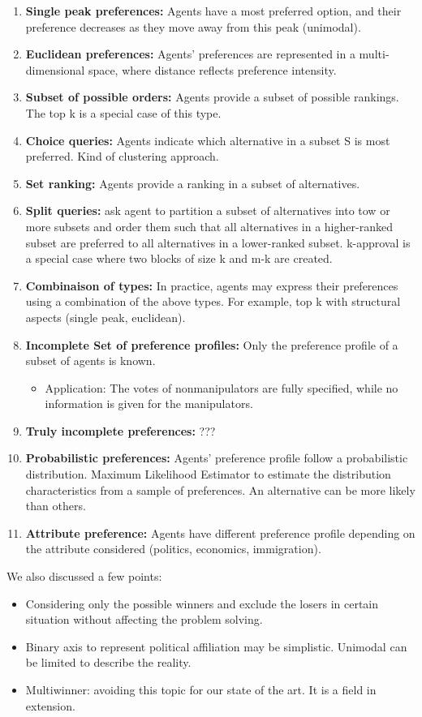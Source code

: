 \documentclass{article}
\begin{document}
\begin{enumerate}
    \item \textbf{Single peak preferences:} Agents have a most preferred option, and their preference decreases as they move away from this peak (unimodal).
    \item \textbf{Euclidean preferences:} Agents' preferences are represented in a multi-dimensional space, where distance reflects preference intensity.
    \item \textbf{Subset of possible orders:} Agents provide a subset of possible rankings. The top k is a special case of this type.
    \item \textbf{Choice queries:} Agents indicate which alternative in a subset S is most preferred. Kind of clustering approach.
    \item \textbf{Set ranking:} Agents provide a ranking in a subset of alternatives.
    \item \textbf{Split queries:} ask agent to partition a subset of alternatives into tow or more subsets and order them such that all alternatives in a higher-ranked subset are preferred to all alternatives in a lower-ranked subset. k-approval is a special case where two blocks of size k and m-k are created.
    \item \textbf{Combinaison of types:} In practice, agents may express their preferences using a combination of the above types. For example, top k with structural aspects (single peak, euclidean).
    \item \textbf{Incomplete Set of preference profiles:} Only the preference profile of a subset of agents is known.
    \begin{itemize}
        \item Application: The votes of nonmanipulators are fully specified, while no information is given for the manipulators.
    \end{itemize}
    \item \textbf{Truly incomplete preferences:} ???
    \item \textbf{Probabilistic preferences:} Agents' preference profile follow a probabilistic distribution. Maximum Likelihood Estimator to estimate the distribution characteristics from a sample of preferences. An alternative can be more likely than others.
    \item \textbf{Attribute preference:} Agents have different preference profile depending on the attribute considered (politics, economics, immigration).
\end{enumerate}

We also discussed a few points:
\begin{itemize}
    \item Considering only the possible winners and exclude the losers in certain situation without affecting the problem solving.
    \item Binary axis to represent political affiliation may be simplistic. Unimodal can be limited to describe the reality.
    \item Multiwinner: avoiding this topic for our state of the art. It is a field in extension.
\end{itemize}
\end{document}

